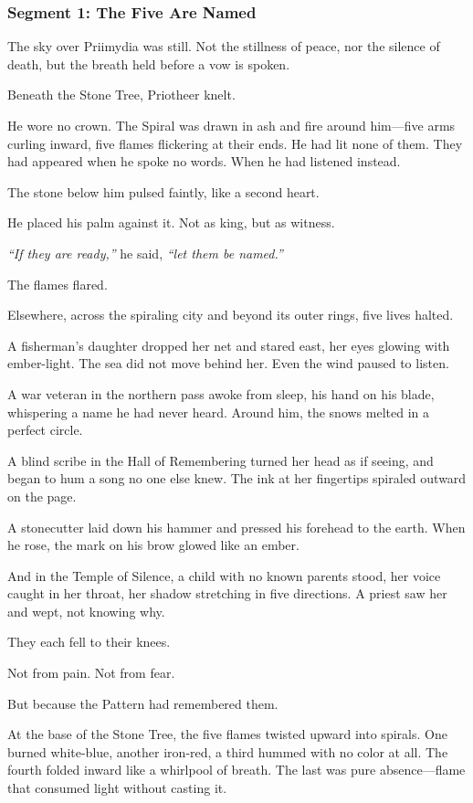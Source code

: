 \documentclass[9pt]{article}
\begin{document}
\newpage

\subsubsection*{Segment 1: The Five Are Named}

The sky over Priimydia was still. Not the stillness of peace, nor the silence of death, but the breath held before a vow is spoken.

Beneath the Stone Tree, Priotheer knelt.

He wore no crown. The Spiral was drawn in ash and fire around him—five arms curling inward, five flames flickering at their ends. He had lit none of them. They had appeared when he spoke no words. When he had listened instead.

The stone below him pulsed faintly, like a second heart.

He placed his palm against it. Not as king, but as witness.

\emph{``If they are ready,''} he said, \emph{``let them be named.''}

The flames flared.

Elsewhere, across the spiraling city and beyond its outer rings, five lives halted.

A fisherman's daughter dropped her net and stared east, her eyes glowing with ember-light. The sea did not move behind her. Even the wind paused to listen.

A war veteran in the northern pass awoke from sleep, his hand on his blade, whispering a name he had never heard. Around him, the snows melted in a perfect circle.

A blind scribe in the Hall of Remembering turned her head as if seeing, and began to hum a song no one else knew. The ink at her fingertips spiraled outward on the page.

A stonecutter laid down his hammer and pressed his forehead to the earth. When he rose, the mark on his brow glowed like an ember.

And in the Temple of Silence, a child with no known parents stood, her voice caught in her throat, her shadow stretching in five directions. A priest saw her and wept, not knowing why.

They each fell to their knees.

Not from pain. Not from fear.

But because the Pattern had remembered them.

At the base of the Stone Tree, the five flames twisted upward into spirals. One burned white-blue, another iron-red, a third hummed with no color at all. The fourth folded inward like a whirlpool of breath. The last was pure absence—flame that consumed light without casting it.
\end{document}
